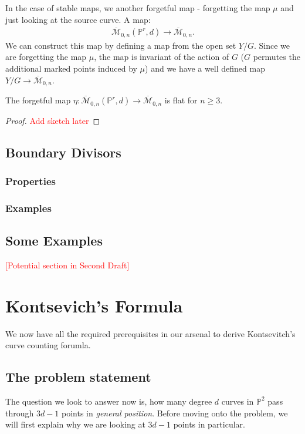 \par In the case of stable maps, we another forgetful map - forgetting the map $\mu$ and just looking at the source curve. 
A map:
\begin{align*}
    \overline{\mathcal{M}}_{0,n}(\mathbb{P}^{r},d) \to \overline{\mathcal{M}}_{0,n}.
\end{align*}
We can construct this map by defining a map from the open set $Y/G$. 
Since we are forgetting the map $\mu$, the map is invariant of the action of $G$ ($G$ permutes the additional marked points induced by $\mu$) and we have a well defined map $Y/G \to \overline{\mathcal{M}}_{0,n}$.

\begin{lemma}
    The forgetful map $\eta : \overline{\mathcal{M}}_{0,n}(\mathbb{P}^{r},d) \to \overline{\mathcal{M}}_{0,n}$ is flat for $n \geq 3$.
\end{lemma}
\begin{proof}
    \textcolor{red}{Add sketch later}
\end{proof}

\subsection{Boundary Divisors}

\subsubsection{Properties}
\subsubsection{Examples}

\subsection{Some Examples}
\textcolor{red}{[Potential section in Second Draft]}

\section{Kontsevich's Formula}

We now have all the required prerequisites in our arsenal to derive Kontsevitch's curve counting forumla.

\subsection{The problem statement}
The question we look to answer now is, how many degree $d$ curves in $\mathbb{P}^{2}$ pass through $3d-1$ points in \textit{general position}. 
Before moving onto the problem, we will first explain why we are looking at $3d-1$ points in particular.

